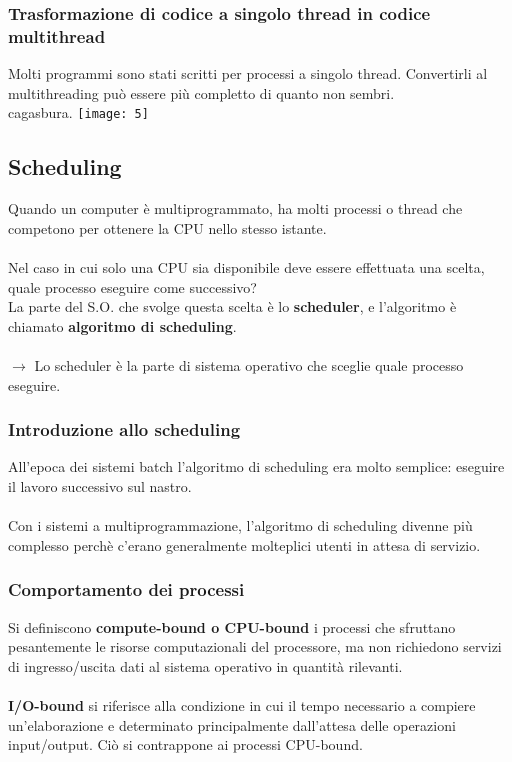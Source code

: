 \documentclass{article}
\begin{document}
\subsubsection{Trasformazione di codice a singolo thread in codice multithread}
Molti programmi sono stati scritti per processi a singolo thread. Convertirli al 
multithreading può essere più completto di quanto non sembri.\\
cagasbura. \texttt{[image: 5]}

\subsection{Scheduling}
Quando un computer è multiprogrammato, ha molti processi o thread che competono per ottenere la CPU nello stesso istante.
\\
\\
Nel caso in cui solo una CPU sia disponibile deve essere effettuata una scelta, quale processo eseguire come successivo?
\\La parte del S.O. che svolge questa scelta è lo \textbf{scheduler}, e l'algoritmo è chiamato \textbf{algoritmo di scheduling}.
\\
\\
$\rightarrow$ Lo scheduler è la parte di sistema operativo che sceglie quale processo eseguire.

\subsubsection{Introduzione allo scheduling}
All'epoca dei sistemi batch l'algoritmo di scheduling era molto semplice: eseguire il lavoro successivo sul nastro. 
\\
\\
Con i sistemi a multiprogrammazione, l'algoritmo di scheduling divenne più complesso perchè c'erano generalmente molteplici utenti in attesa di servizio.

\subsubsection{Comportamento dei processi}
Si definiscono \textbf{compute-bound o CPU-bound} i processi che sfruttano pesantemente le risorse computazionali del processore, 
ma non richiedono servizi di ingresso/uscita dati al sistema operativo in quantità rilevanti.
\\
\\
\textbf{I/O-bound} si riferisce alla condizione in cui il tempo necessario a compiere un'elaborazione e determinato principalmente dall'attesa delle operazioni input/output. Ciò si contrappone ai processi CPU-bound.
\end{document}
